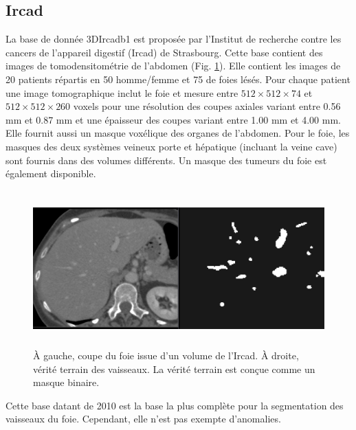 
\subsection{Ircad}
La base de donnée 3DIrcadb1 est proposée par l'Institut de recherche contre les cancers de l'appareil digestif (Ircad) de Strasbourg. Cette base contient des images de tomodensitométrie de l'abdomen (Fig. \ref{fig:Ircad_examples}). Elle contient les images de 20 patients répartis en 50 \percent{}homme/femme et 75 \percent{}de foies lésés. Pour chaque patient une image tomographique inclut le foie et mesure entre $512 \times 512 \times 74$ et $512 \times 512 \times 260$ voxels pour une résolution des coupes axiales variant entre 0.56 mm et 0.87 mm et une épaisseur des coupes variant entre 1.00 mm et 4.00 mm. Elle fournit aussi un masque voxélique des organes de l'abdomen. Pour le foie, les masques des deux systèmes veineux porte et hépatique (incluant la veine cave) sont fournis dans des volumes différents. Un masque des tumeurs du foie est également disponible.
\begin{figure}
    \centering
    \includegraphics[height=6cm]{Images/Ircad_examples.png}
    \caption{À gauche, coupe du foie issue d'un volume de l'Ircad. À droite, vérité terrain des vaisseaux. La vérité terrain est conçue comme un masque binaire.}
    \label{fig:Ircad_examples}
\end{figure}
Cette base datant de 2010 est la base la plus complète pour la segmentation des vaisseaux du foie. Cependant, elle n'est pas exempte d'anomalies. 

